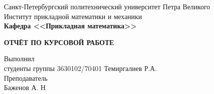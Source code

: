 \documentclass[main.tex]{subfiles}
\begin{document}
\begin{titlepage}
\begin{center}
	\begin{large}
		Санкт-Петербургский политехнический университет Петра Великого\\
		Институт прикладной математики и механики\\
		\textbf{Кафедра <<Прикладная математика>>}\\
	\end{large}
	\vfill
	\Large{\textbf{ОТЧЁТ ПО КУРСОВОЙ РАБОТЕ\\}}
\end{center}
\vfill
\flushleft
Выполнил\\
студенты группы 3630102/70401
\flushright
Темиргалиев Р.А.\\
\flushleft
Преподаватель\\
\flushright
Баженов А. Н
\vfill
{}
\end{titlepage}
\end{document}
